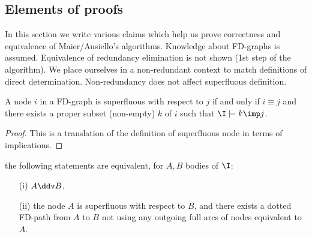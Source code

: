 \subsection{Elements of proofs}

In this section we write various claims which help us prove correctness and 
equivalence of Maier/Ausiello's algorithms. Knowledge about FD-graphs is 
assumed. Equivalence of redundancy elimination is not shown (1st step of 
the algorithm). We place ourselves in a non-redundant context to match
definitions of direct determination. Non-redundancy does not affect superfluous
definition.

\begin{proposition} \label{prop:maier.equiv_sup_sub}
	A node $i$ in a FD-graph is superfluous with respect to $j$ if and only if 
	$i \equiv j$ and there exists a proper subset (non-empty) $k$ of $i$ such 
	that $\I \models k \imp j$. 
\end{proposition}

\begin{proof} This is a translation of the definition of superfluous node in 
	terms of implications.	
\end{proof}

\begin{proposition} \label{prop:maier.equiv_ssup_dd}
	the following statements are equivalent, for $A, B$ bodies of $\I$:
	\begin{itemize}
		\item[(i)] $A \ddv B$,
		\item[(ii)] the node $A$ is superfluous with respect to $B$, and there 
		exists 
		a dotted FD-path from $A$ to $B$ not using any outgoing full arcs of
		nodes equivalent to $A$.
	\end{itemize}
	
\end{proposition}

